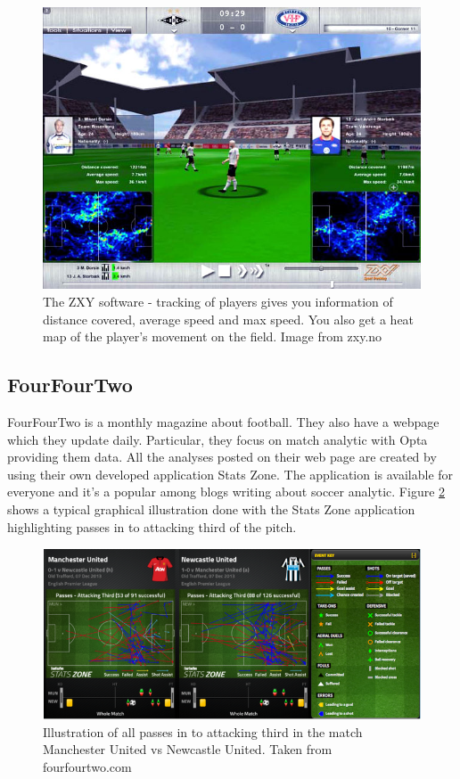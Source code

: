 \begin{figure}[ht!]
\centering
\includegraphics[width=1\textwidth]{images/general/zxysoftware.png}
\caption{The ZXY software - tracking of players gives you information of distance covered, average speed and max speed. You also get a heat map of the player’s movement on the field. Image from zxy.no}
\label{fig:zxysoftware}
\end{figure}

\subsection{FourFourTwo}

FourFourTwo is a monthly magazine about football. They also have a webpage which they update daily. Particular, they focus on match analytic with Opta providing them data. All the analyses posted on their web page are created by using their own developed application Stats Zone. The application is available for everyone and it’s a popular among blogs writing about soccer analytic. Figure \ref{fig:fourfourtwo} shows a typical graphical illustration done with the Stats Zone application highlighting passes in to attacking third of the pitch. 

\begin{figure}[ht!]
\centering
\includegraphics[width=1\textwidth]{images/general/fourfourtwo.png}
\caption{Illustration of all passes in to attacking third in the match Manchester United vs Newcastle United. Taken from fourfourtwo.com}
\label{fig:fourfourtwo}
\end{figure}



